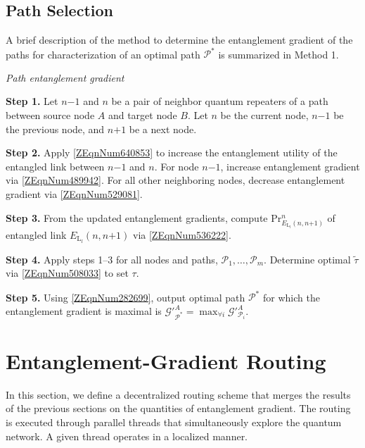 \documentclass[11pt]{article}%
\newenvironment{method}[1][htb]
  {\renewcommand{\algorithmcfname}{Method}
   \begin{algorithm}[#1]%
  }{\end{algorithm}}
\begin{document}
\subsection{Path Selection}

A brief description of the method to determine the entanglement gradient of the paths for characterization of an optimal path ${\mathcal{P}}^{\mathrm{*}}$ is summarized in Method 1. 

\begin{method}
  \DontPrintSemicolon
\caption{\textit{Path entanglement gradient}}
\textbf{Step 1.} Let $n\mathrm{-}\mathrm{1}$ and $n$ be a pair of neighbor quantum repeaters of a path between source node $A$ and target node $B$. 
Let $n$ be the current node, $n\mathrm{-}\mathrm{1}$ be the previous node, and $n\mathrm{+1}$ be a next node. 

\textbf{Step 2.} Apply \eqref{ZEqnNum640853} to increase the entanglement utility of the entangled link between  $n\mathrm{-}\mathrm{1}$ and $n$. For node $n\mathrm{-}\mathrm{1}$, increase entanglement gradient via \eqref{ZEqnNum489942}. For all other neighboring nodes, decrease entanglement gradient via \eqref{ZEqnNum529081}.

\textbf{Step 3.} From the updated entanglement gradients, compute $\mathrm{P}{\mathrm{r}}^n_{E_{{\mathrm{L}}_l}\left(n,n\mathrm{+1}\right)}$ of entangled link $E_{{\mathrm{L}}_l}\left(n,n\mathrm{+1}\right)$ via \eqref{ZEqnNum536222}.

\textbf{Step 4.} Apply steps 1--3 for all nodes and paths, ${\mathcal{P}}_{\mathrm{1}}\mathrm{,\dots ,}{\mathcal{P}}_m$. Determine optimal $\widetilde{\tau }$ via \eqref{ZEqnNum508033} to set $\tau $. 

\textbf{Step 5.} Using \eqref{ZEqnNum282699}, output optimal path ${\mathcal{P}}^{\mathrm{*}}$ for which the entanglement gradient is maximal is ${\mathcal{G}}'^A_{{\mathcal{P}}^{\mathrm{*}}}\mathrm{=}\mathop{\mathrm{max}}_{\mathrm{\forall }i}{\mathcal{G}}'^A_{{\mathcal{P}}_i}$. 
\end{method}
 
\section{Entanglement-Gradient Routing }
\label{sec4}
In this section, we define a decentralized routing scheme that merges the results of the previous sections on the quantities of entanglement gradient. The routing is executed through parallel threads that simultaneously explore the quantum network. A given thread operates in a localized manner.
 
\end{document}
